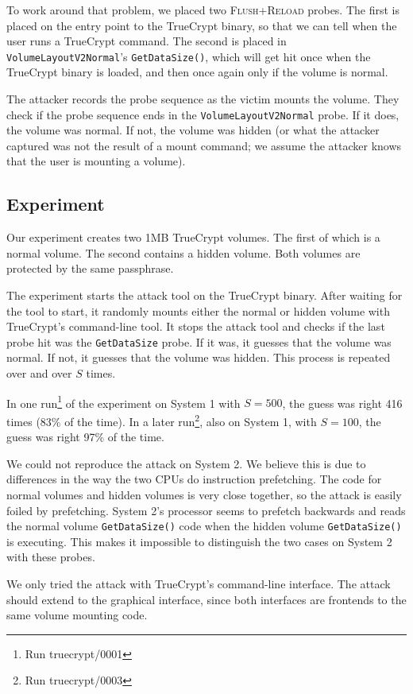 \documentclass{acm_proc_article-sp}
\begin{document}
To work around that problem, we placed two \textsc{Flush+Reload} probes. The
first is placed on the entry point to the TrueCrypt binary, so that we can tell
when the user runs a TrueCrypt command. The second is placed in
\texttt{VolumeLayoutV2Normal}'s \texttt{GetDataSize()}, which will get hit once
when the TrueCrypt binary is loaded, and then once again only if the volume is
normal.

The attacker records the probe sequence as the victim mounts the volume. They
check if the probe sequence ends in the \texttt{VolumeLayoutV2Normal} probe. If
it does, the volume was normal. If not, the volume was hidden (or what the
attacker captured was not the result of a mount command; we assume the attacker
knows that the user is mounting a volume).

\subsection{Experiment}

Our experiment creates two 1MB TrueCrypt volumes. The first of which is a normal
volume. The second contains a hidden volume. Both volumes are protected by the
same passphrase.

The experiment starts the attack tool on the TrueCrypt binary. After waiting for
the tool to start, it randomly mounts either the normal or hidden volume with
TrueCrypt's command-line tool. It stops the attack tool and checks if the last
probe hit was the \texttt{GetDataSize} probe. If it was, it guesses that the
volume was normal. If not, it guesses that the volume was hidden. This process
is repeated over and over $S$ times.

In one run\footnote{Run truecrypt/0001} of the experiment on System 1 with
$S=500$, the guess was right 416 times (83\% of the time). In a later
run\footnote{Run truecrypt/0003}, also on System 1, with $S=100$, the guess was
right 97\% of the time.

We could not reproduce the attack on System 2. We believe this is due to
differences in the way the two CPUs do instruction prefetching. The code for
normal volumes and hidden volumes is very close together, so the attack is
easily foiled by prefetching. System 2's processor seems to prefetch backwards
and reads the normal volume \texttt{GetDataSize()} code when the hidden volume
\texttt{GetDataSize()} is executing. This makes it impossible to distinguish the
two cases on System 2 with these probes.

We only tried the attack with TrueCrypt's command-line interface. The attack
should extend to the graphical interface, since both interfaces are frontends to
the same volume mounting code. 
\end{document}
